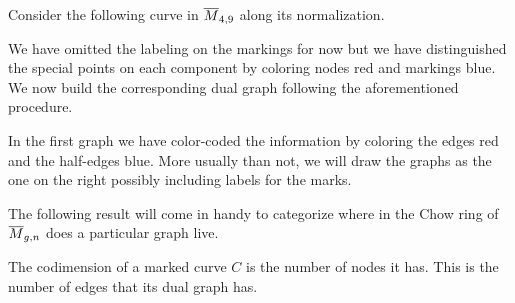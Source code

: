 \documentclass[12pt]{memoir}
\begin{document}
\begin{Ex}
    Consider the following curve in $\overline M_{4,9}$ along its normalization.

    We have omitted the labeling on the markings for now but we have distinguished the special points on each component by coloring nodes red and markings blue. We now build the corresponding dual graph following the aforementioned procedure.

    In the first graph we have color-coded the information by coloring the edges red and the half-edges blue. More usually than not, we will draw the graphs as the one on the right possibly including labels for the marks.
\end{Ex}

The following result will come in handy to categorize where in the Chow ring of $\overline M_{g,n}$ does a particular graph live.
\begin{Th}
    The codimension of a marked curve $C$ is the number of nodes it has. This is the number of edges that its dual graph has.
\end{Th}
\end{document}
